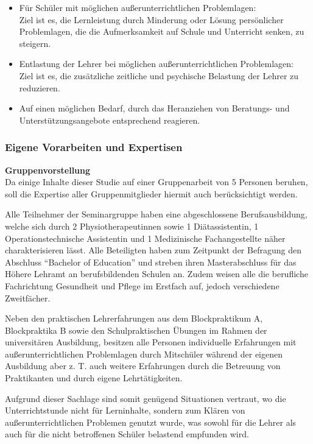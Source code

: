 \begin{itemize}
	\item Für Schüler mit möglichen außerunterrichtlichen Problemlagen:
	\\
	Ziel ist es, die Lernleistung durch Minderung oder Lösung persönlicher Problemlagen, die die Aufmerksamkeit auf Schule und Unterricht senken, zu steigern.
	\item Entlastung der Lehrer bei möglichen außerunterrichtlichen Problemlagen:
	 \\
	Ziel ist es, die zusätzliche zeitliche und psychische Belastung der Lehrer zu reduzieren. 
	\item Auf einen möglichen Bedarf, durch das Heranziehen von Beratungs- und Unterstützungsangebote entsprechend reagieren.
\end{itemize}

\newpage
\subsubsection{Eigene Vorarbeiten und Expertisen}
\label{sec:EigeneVorarbeitenUndExpertisen}

\noindent
\textbf{Gruppenvorstellung}\\

\noindent
Da einige Inhalte dieser Studie auf einer Gruppenarbeit von 5 Personen beruhen, soll die Expertise aller Gruppenmitglieder hiermit auch berücksichtigt werden.

Alle Teilnehmer der Seminargruppe haben eine abgeschlossene Berufsausbildung, welche sich durch 2 Physiotherapeutinnen sowie 1 Diätassistentin, 1 Operationstechnische Assistentin und 1 Medizinische Fachangestellte näher charakterisieren lässt. Alle Beteiligten haben zum Zeitpunkt der Befragung den Abschluss "`Bachelor of Education"' und streben ihren Masterabschluss für das Höhere Lehramt an berufsbildenden Schulen an. Zudem weisen alle die berufliche Fachrichtung Gesundheit und Pflege im Erstfach auf, jedoch verschiedene Zweitfächer.

Neben den praktischen Lehrerfahrungen aus dem Blockpraktikum A, Blockpraktika B sowie den Schulpraktischen Übungen im Rahmen der universitären Ausbildung, besitzen alle Personen individuelle Erfahrungen mit außerunterrichtlichen Problemlagen durch Mitschüler während der eigenen Ausbildung aber z. T. auch weitere Erfahrungen durch die Betreuung von Praktikanten und durch eigene Lehrtätigkeiten.

Aufgrund dieser Sachlage sind somit genügend Situationen vertraut, wo die Unterrichtstunde nicht für Lerninhalte, sondern zum Klären von außerunterrichtlichen Problemen genutzt wurde, was sowohl für die Lehrer als auch für die nicht betroffenen Schüler belastend empfunden wird.

